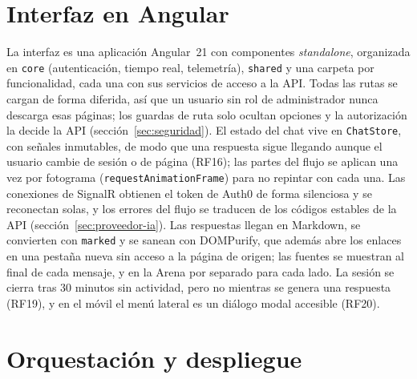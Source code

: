 \section{Interfaz en Angular}
\label{sec:impl-angular-detalle}

La interfaz es una aplicación Angular~21 \cite{angular} con componentes \emph{standalone}, organizada en \texttt{core} (autenticación, tiempo real, telemetría), \texttt{shared} y una carpeta por funcionalidad, cada una con sus servicios de acceso a la API. Todas las rutas se cargan de forma diferida, así que un usuario sin rol de administrador nunca descarga esas páginas; los guardas de ruta solo ocultan opciones y la autorización la decide la API (sección~\ref{sec:seguridad}). El estado del chat vive en \texttt{ChatStore}, con señales inmutables, de modo que una respuesta sigue llegando aunque el usuario cambie de sesión o de página (RF16); las partes del flujo se aplican una vez por fotograma (\texttt{requestAnimationFrame}) para no repintar con cada una. Las conexiones de SignalR obtienen el token de Auth0 de forma silenciosa y se reconectan solas, y los errores del flujo se traducen de los códigos estables de la API (sección~\ref{sec:proveedor-ia}). Las respuestas llegan en Markdown, se convierten con \texttt{marked} y se sanean con DOMPurify, que además abre los enlaces en una pestaña nueva sin acceso a la página de origen; las fuentes se muestran al final de cada mensaje, y en la Arena por separado para cada lado. La sesión se cierra tras 30 minutos sin actividad, pero no mientras se genera una respuesta (RF19), y en el móvil el menú lateral es un diálogo modal accesible (RF20).

\section{Orquestación y despliegue}
\label{sec:impl-despliegue-detalle}

